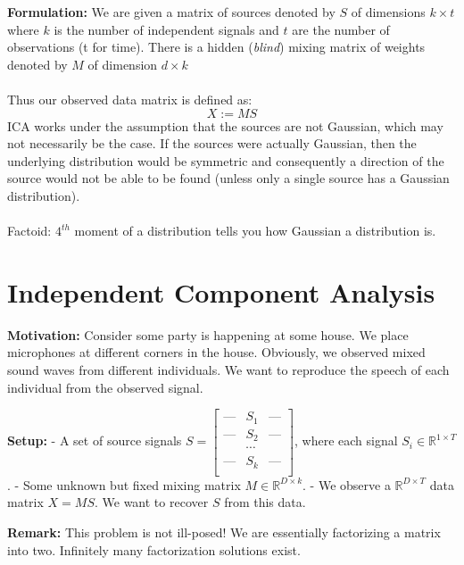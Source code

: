 \textbf{Formulation: } We are given a matrix of sources denoted by $S$ of dimensions $k \times t$ where $k$ is the number of independent signals and $t$ are the number of observations (t for time). There is a hidden (\textit{blind}) mixing matrix of weights denoted by $M$ of dimension $d \times k$ \\ \\ 
Thus our observed data matrix is defined as: \[ X := MS \]
ICA works under the assumption that the sources are not Gaussian, which may not necessarily be the case. If the sources were actually Gaussian, then the underlying distribution would be symmetric and consequently a direction of the source would not be able to be found (unless only a single source has a Gaussian distribution).  \\ \\
Factoid: $4^{th}$ moment of a distribution tells you how Gaussian a distribution is. 

\section{Independent Component Analysis}
\textbf{Motivation: } \newline Consider some party is happening at some house. We place microphones at different corners in the house. Obviously, we observed mixed sound waves from different individuals. We want to reproduce the speech of each individual from the observed signal.

\textbf{Setup: }  
\newline - A set of source signals $ S = 
\begin{bmatrix}
    \text{---} & S_1 & \text{---}\\
    \text{---} & S_2 & \text{---}  \\
     & \cdots &   \\
    \text{---} & S_k & \text{---} \\
\end{bmatrix} $, where each signal $ S_i \in \mathbb{R}^{1\times T}$. 
\newline - Some unknown but fixed mixing matrix $M \in \mathbb{R}^{D\times k} $. 
\newline - We observe a $\mathbb{R}^{D\times T}$ data matrix $X = MS$. We want to recover $S$ from this data.

\textbf{Remark: } \newline
This problem is not ill-posed! We are essentially factorizing a matrix into two. Infinitely many factorization solutions exist.

